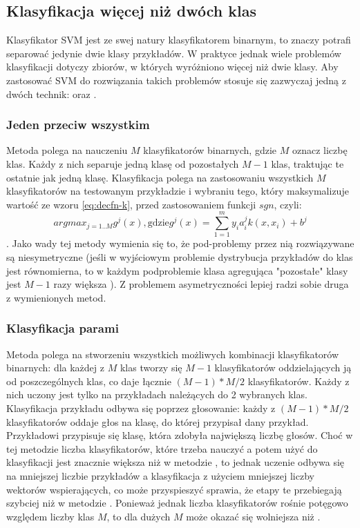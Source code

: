 \subsection{Klasyfikacja więcej niż dwóch klas}
Klasyfikator SVM jest ze swej natury klasyfikatorem binarnym, to znaczy potrafi separować jedynie dwie klasy przykładów. W praktyce jednak wiele problemów klasyfikacji dotyczy zbiorów, w których wyróżniono więcej niż dwie klasy. Aby zastosować SVM do rozwiązania takich problemów stosuje się zazwyczaj jedną z dwóch technik:  oraz . 

\subsubsection{Jeden przeciw wszystkim}
Metoda  polega na nauczeniu $ M $ klasyfikatorów binarnych, gdzie $ M $ oznacz liczbę klas. Każdy z nich separuje jedną klasę od pozostałych $ M-1 $ klas, traktując te ostatnie jak jedną klasę. Klasyfikacja polega na zastosowaniu wszystkich $ M $ klasyfikatorów na testowanym przykładzie i wybraniu tego, który maksymalizuje wartość ze wzoru \ref{eq:decfn-k}, przed zastosowaniem funkcji $ sgn $, czyli:
$$ argmax_{j=1..M} g^j(x), \text{gdzie} g^j(x) = \sum_{1=1}^m y_ia_i^j k(x, x_i) + b^j $$.
Jako wady tej metody wymienia się to, że pod-problemy przez nią rozwiązywane są niesymetryczne (jeśli w wyjściowym problemie dystrybucja przykładów do klas jest równomierna, to w każdym podproblemie klasa agregująca "pozostałe" klasy jest $ M-1 $ razy większa ). Z problemem asymetryczności lepiej radzi sobie druga z wymienionych metod.

\subsubsection{Klasyfikacja parami}
Metoda  polega na stworzeniu wszystkich możliwych kombinacji klasyfikatorów binarnych: dla każdej z $ M $ klas tworzy się $ M-1 $ klasyfikatorów oddzielających ją od poszczególnych klas, co daje łącznie $ (M-1)*M/2 $ klasyfikatorów. Każdy z nich uczony jest tylko na przykładach należących do 2 wybranych klas. Klasyfikacja przykładu odbywa się poprzez głosowanie: każdy z $ (M-1)*M/2 $ klasyfikatorów oddaje głos na klasę, do której przypisał dany przykład. Przykładowi przypisuje się klasę, która zdobyła największą liczbę głosów.
Choć w tej metodzie liczba klasyfikatorów, które trzeba nauczyć a potem użyć do klasyfikacji jest znacznie większa niż w metodzie , to jednak uczenie odbywa się na mniejszej liczbie przykładów a klasyfikacja z użyciem mniejszej liczby wektorów wspierających, co może przyspieszyć sprawia, że etapy te przebiegają szybciej niż w metodzie . Ponieważ jednak liczba klasyfikatorów rośnie potęgowo względem liczby klas $ M $, to dla dużych $ M $  może okazać się wolniejsza niż .


